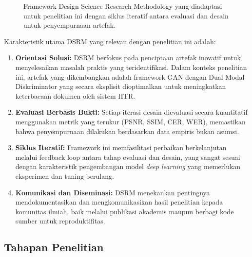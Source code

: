 \documentclass[12pt,a4paper]{article}
\begin{document}
\begin{figure}[H]
\caption{Framework Design Science Research Methodology yang diadaptasi untuk penelitian ini dengan siklus iteratif antara evaluasi dan desain untuk penyempurnaan artefak.}
\label{fig:dsrm-framework}
\end{figure}

Karakteristik utama DSRM yang relevan dengan penelitian ini adalah:

\begin{enumerate}[label=\arabic*., leftmargin=*, nosep]
\item \textbf{Orientasi Solusi:} DSRM berfokus pada penciptaan artefak inovatif untuk menyelesaikan masalah praktis yang teridentifikasi. Dalam konteks penelitian ini, artefak yang dikembangkan adalah framework GAN dengan Dual Modal Diskriminator yang secara eksplisit dioptimalkan untuk meningkatkan keterbacaan dokumen oleh sistem HTR.

\item \textbf{Evaluasi Berbasis Bukti:} Setiap iterasi desain dievaluasi secara kuantitatif menggunakan metrik yang terukur (PSNR, SSIM, CER, WER), memastikan bahwa penyempurnaan dilakukan berdasarkan data empiris bukan asumsi.

\item \textbf{Siklus Iteratif:} Framework ini memfasilitasi perbaikan berkelanjutan melalui feedback loop antara tahap evaluasi dan desain, yang sangat sesuai dengan karakteristik pengembangan model \textit{deep learning} yang memerlukan eksperimen dan tuning berulang.

\item \textbf{Komunikasi dan Diseminasi:} DSRM menekankan pentingnya mendokumentasikan dan mengkomunikasikan hasil penelitian kepada komunitas ilmiah, baik melalui publikasi akademis maupun berbagi kode sumber untuk reproduktifitas.
\end{enumerate}
\vspace{1em}
\subsection{Tahapan Penelitian}
\label{subsec:tahapan-penelitian}
\end{document}

